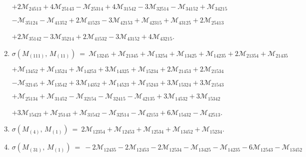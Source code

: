 \documentclass[12pt]{article}
\newcommand{\M}{\mathcal{M}}
\begin{document}
\begin{enumerate}
      \hspace{10pt}
      $+2\M_{24513} 
       +4\M_{25143} -\M_{25314} 
       +4\M_{31542} -3\M_{32514} 
       -\M_{34152} +\M_{34215} $\vspace{-6pt}

      \hspace{10pt}
      $-\M_{35124} -\M_{41352} 
       +2\M_{41523} -3\M_{42153} 
       +\M_{42315} +\M_{43125} 
       +2\M_{25413} $\vspace{-6pt}

      \hspace{10pt}
      $+2\M_{35142} 
       -3\M_{35214} +2\M_{41532} 
       -3\M_{43152} +4\M_{43215} $.\vspace{-8pt}
\item[]\hspace{-50pt}$\sigma(M_{(111)},\,M_{(11)})\ =\ 
        \M_{13245} +\M_{21345} 
       +\M_{13254} +\M_{13425} 
       +\M_{14235} +2\M_{21354} 
       +\M_{21435} $\vspace{-6pt}

      \hspace{10pt}
      $+\M_{13452} 
       +\M_{13524} +\M_{14253} 
       +3\M_{14325} +\M_{15234} 
       +2\M_{21453} +2\M_{21534} $\vspace{-6pt}

      \hspace{10pt}
      $-\M_{32145} +\M_{13542} 
       +3\M_{14352} +\M_{14523} 
       +\M_{15243} +3\M_{15324} 
       +3\M_{21543} $\vspace{-6pt}

      \hspace{10pt}
      $+\M_{25134} 
       +\M_{31452} -\M_{32154} 
       -\M_{32415} -\M_{42135} 
       +3\M_{14532} +3\M_{15342} $\vspace{-6pt}

      \hspace{10pt}
      $+3\M_{15423} +\M_{25143} 
       +\M_{31542} -\M_{32514} 
       -\M_{42153} +6\M_{15432} 
       -\M_{42513} $.\vspace{-8pt}
\item[]\hspace{-50pt}$\sigma(M_{(4)},\,M_{(1)})\ =\ 
        2\M_{12354} +\M_{12453} 
       +\M_{12534} +\M_{13452} 
       +\M_{15234} $.\vspace{-8pt}
\item[]\hspace{-50pt}$\sigma(M_{(31)},\,M_{(1)})\ =\ 
        -2\M_{12435} -2\M_{12453} 
       -2\M_{12534} -\M_{13425} 
       -\M_{14235} -6\M_{12543} 
       -\M_{13452} $\vspace{-6pt}


\end{enumerate}
\end{document}
